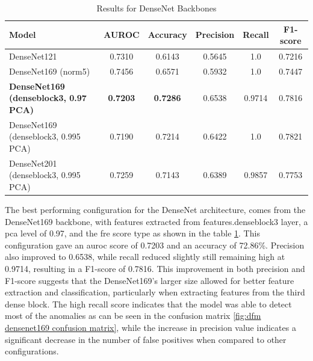 \begin{table}[ht!]
    \centering
    \begin{tabular}{|l|c|c|c|c|c|}
        \hline
        \textbf{Model} & \textbf{AUROC} & \textbf{Accuracy} & \textbf{Precision} & \textbf{Recall} & \textbf{F1-score} \\ \hline
        DenseNet121 & 0.7310 & 0.6143 & 0.5645 & 1.0 & 0.7216 \\ \hline
        DenseNet169 (norm5) & 0.7456 & 0.6571 & 0.5932 & 1.0 & 0.7447 \\ \hline
        \textbf{DenseNet169 (denseblock3, 0.97 PCA)} & \textbf{0.7203} & \textbf{0.7286} & 0.6538 & 0.9714 & 0.7816 \\ \hline
        DenseNet169 (denseblock3, 0.995 PCA) & 0.7190 & 0.7214 & 0.6422 & 1.0 & 0.7821 \\ \hline
        DenseNet201 (denseblock3, 0.995 PCA) & 0.7259 & 0.7143 & 0.6389 & 0.9857 & 0.7753 \\ \hline
    \end{tabular}
    \caption{Results for DenseNet Backbones}
    \label{tab:dfm densenet results}
\end{table}

The best performing configuration for the DenseNet architecture, comes from the DenseNet169 backbone, with features extracted from features.denseblock3 layer, a \gls{pca} level of 0.97, and the \gls{fre} score type as shown in the table \ref{tab:dfm densenet results}. This configuration gave an \gls{auroc} score of 0.7203 and an accuracy of 72.86\%. Precision also improved to 0.6538, while recall reduced slightly still remaining high at 0.9714, resulting in a F1-score of 0.7816. This improvement in both precision and F1-score suggests that the DenseNet169's larger size allowed for better feature extraction and classification, particularly when extracting features from the third dense block. The high recall score indicates that the model was able to detect most of the anomalies as can be seen in the confusion matrix \ref{fig:dfm densenet169 confusion matrix}, while the increase in precision value indicates a significant decrease in the number of false positives when compared to other configurations.

